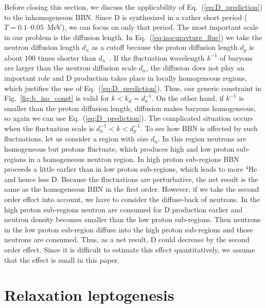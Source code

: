 \documentclass[11pt,a4paper]{article}
\begin{document}
Before closing this section, we discuss the applicability of Eq.~(\ref{eq:D_prediction}) to the inhomogeneous BBN.
Since D is synthesized in a rather short period ($T=0.1$--$0.05$~MeV), we can focus on only that period.
The most important scale in our problem is the diffusion length. 
In Eq.~(\ref{eq:isocuravture_fluc}) we take the neutron diffusion length $d_n$ as a cutoff because the proton diffusion length $d_p$ is about $100$ times shorter than $d_n$~\cite{Applegate:1987hm}. 
If the fluctuation wavelength $k^{-1}$ of baryons are larger than the neutron diffusion scale $d_n$, the diffusion does not play an important role and D production takes place in locally homogeneous regions, which justifies the use of Eq.~(\ref{eq:D_prediction}). 
Thus, our generic constraint in Fig.~\ref{fig:b_iso_const} is valid for $k < k_d=d_n^{-1}$.
On the other hand, if $k^{-1}$ is smaller than the proton diffusion length, diffusion makes baryons homogeneous, so again we can use Eq.~(\ref{eq:D_prediction}).
The complicated situation occurs when the fluctuation scale is $d_n^{-1} < k < d_p^{-1}$.
To see how BBN is affected by such fluctuations, let us consider a region with size $d_n$. 
In this region neutrons are homogeneous but protons fluctuate, which produces high and low proton sub-regions in a homogeneous neutron region.
In high proton sub-regions BBN proceeds a little earlier than in low proton sub-regions, which
leads to more $^4$He and hence less D.
Because the fluctuations are perturbative,  the net result is the same as the homogeneous BBN in the first order. 
However, if we take the second order effect into account, we have to consider the diffuse-back of neutrons.
In the high proton sub-regions neutron are consumed for D production earlier and neutron density 
becomes smaller than the low proton sub-regions. 
Then neutrons in the low proton sub-region diffuse into the high proton sub-regions and those neutrons are consumed. 
Thus, as a net result, D could decrease by the second order effect. 
Since it is difficult to estimate this effect quantitatively, we assume that the effect is small in this paper. 


\section{Relaxation leptogenesis}
\label{sec:relaxation_leptogenesis}
 
\end{document}

